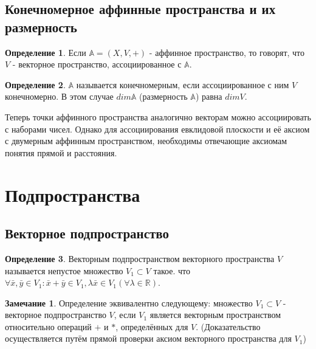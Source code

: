 \documentclass[a4paper, 12pt]{article}
\theoremstyle{definition}
\newtheorem*{definition}{Определение}
\newtheorem*{remark}{Замечание}
\begin{document}
	\subsection{Конечномерное аффинные пространства и их размерность}
	\begin{definition}
		Если $\mathbb{A} = (X, V, +)$ - аффинное пространство, то говорят, что $V$ - векторное пространство, ассоциированное с $\mathbb{A}$.    
	\end{definition}
	\begin{definition}
		$\mathbb{A}$ называется конечномерным, если ассоциированное с ним $V$ конечномерно. В этом случае $dim \mathbb{A}$ (размерность $\mathbb{A}$) равна $dim V$.
	\end{definition}
	Теперь точки аффинного пространства аналогично векторам можно ассоциировать с наборами чисел. Однако для ассоциирования евклидовой плоскости и её аксиом с двумерным аффинным пространством, необходимы отвечающие аксиомам понятия прямой и расстояния.
	\section{Подпространства}
	\subsection{Векторное подпространство}
	\begin{definition}
		Векторным подпространством векторного пространства $V$ называется непустое множество $V_{1} \subset V$ такое. что $\forall\bar{x}, \bar{y}\in V_{1}: \bar{x} + \bar{y} \in V_{1}, \lambda\bar{x} \in V_{1} (\forall\lambda \in\mathbb{R})$.
	\end{definition}
	\begin{remark}
		Определение эквивалентно следующему: множество $V_{1} \subset V$ - векторное подпространство $V$, если $V_{1}$ является векторным пространством относительно операций $+$ и $*$, определённых для $V$.
		(Доказательство осуществляется путём прямой проверки аксиом векторного пространства для $V_{1}$)
	\end{remark}
\end{document}
